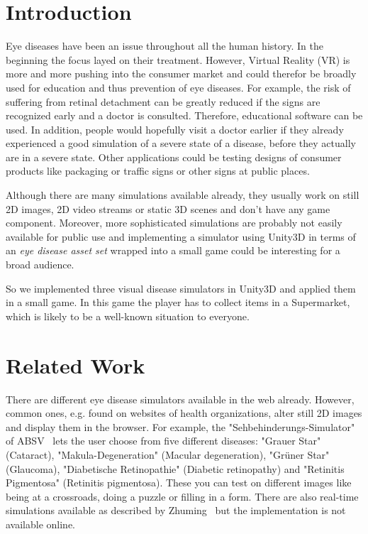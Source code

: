 \documentclass{sig-alternate-05-2015}
\begin{document}
\section{Introduction}
Eye diseases have been an issue throughout all the human history.
In the beginning the focus layed on their treatment.
However, Virtual Reality (VR) is more and more pushing into the consumer market and could therefor be broadly used for education and thus prevention of eye diseases.
For example, the risk of suffering from retinal detachment can be greatly reduced if the signs are recognized early and a doctor is consulted.
Therefore, educational software can be used.
In addition, people would hopefully visit a doctor earlier if they already experienced a good simulation of a severe state of a disease, before they actually are in a severe state.
Other applications could be testing designs of consumer products like packaging or traffic signs or other signs at public places.

Although there are many simulations available already, they usually work on still 2D images, 2D video streams or static 3D scenes and don't have any game component.
Moreover, more sophisticated simulations are probably not easily available for public use and implementing a simulator using Unity3D in terms of an \emph{eye disease asset set} wrapped into a small game could be interesting for a broad audience.

So we implemented three visual disease simulators in Unity3D and applied them in a small game.
In this game the player has to collect items in a Supermarket, which is likely to be a well-known situation to everyone.

\section{Related Work}
There are different eye disease simulators available in the web already.
However, common ones, e.g. found on websites of health organizations, alter still 2D images and display them in the browser.
For example, the "Sehbehinderungs-Simulator" of ABSV~\cite{absv} lets the user choose from five different diseases: "Grauer Star" (Cataract), "Makula-Degeneration" (Macular degeneration), "Grüner Star" (Glaucoma), "Diabetische Retinopathie" (Diabetic retinopathy) and "Retinitis Pigmentosa" (Retinitis pigmentosa).
These you can test on different images like being at a crossroads, doing a puzzle or filling in a form. 
There are also real-time simulations available as described by Zhuming~\cite{eyediseasesim-zhuming} but the implementation is not available online.
\end{document}

